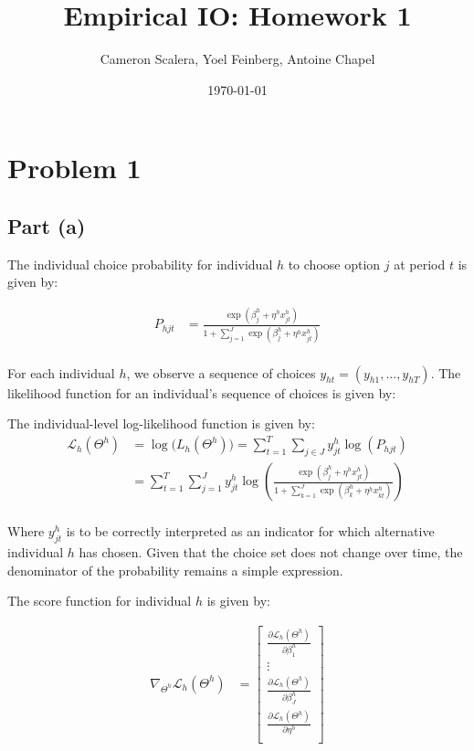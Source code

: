 \documentclass[12pt]{article}
\title{Empirical IO: Homework 1}
\author{Cameron Scalera, Yoel Feinberg, Antoine Chapel}
\date{\today}
\theoremstyle{plain}
\begin{document}
\maketitle

\section*{Problem 1}
\subsection*{Part (a)}

The individual choice probability for individual $h$ to choose option $j$ at
period $t$ is given by:

\begin{align*}
  P_{hjt} &= \frac{\exp(\beta_j^h + \eta^h x_{jt}^h)}{1 + \sum_{j=1}^J \exp(\beta_j^h + \eta^h x_{jt}^h)} \\
\end{align*}

For each individual $h$, we observe a sequence of choices $y_{ht} = (y_{h1},
..., y_{hT})$. The likelihood function for an individual's sequence of choices
is given by:

The individual-level log-likelihood function is given by:
\begin{align*}
  \mathcal{L}_h(\Theta^h) &= \log\big(L_h(\Theta^h)\big) = \sum_{t=1}^T \sum_{j \in J} y_{jt}^h \log(P_{hjt}) \\
  &= \sum_{t=1}^T \sum_{j=1}^J  y_{jt}^h \log\left(\frac{\exp(\beta_j^h + \eta^h x_{jt}^h)}{1 + \sum_{k=1}^J \exp(\beta_k^h + \eta^h x_{kt}^h)}\right) \\
\end{align*}

Where $y_{jt}^h$ is to be correctly interpreted as an indicator for which
alternative individual $h$ has chosen. Given that the choice set does not change
over time, the denominator of the probability remains a simple expression.

The score function for individual $h$ is given by:


\begin{align*}
  \nabla_{\Theta^h} \mathcal{L}_h(\Theta^h) &= \begin{bmatrix}
    \frac{\partial \mathcal{L}_h(\Theta^h)}{\partial \beta_1^h} \\
    \vdots \\
    \frac{\partial \mathcal{L}_h(\Theta^h)}{\partial \beta_J^h} \\
    \frac{\partial \mathcal{L}_h(\Theta^h)}{\partial \eta^h} \\
   \end{bmatrix}
\end{align*}
\end{document}
